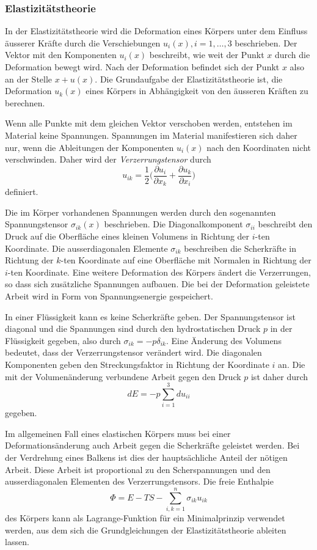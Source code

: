%
%
\subsubsection{Elastizitätstheorie}
In der Elastizitätstheorie wird die Deformation eines Körpers unter
dem Einfluss äusserer Kräfte durch die Verschiebungen
$u_{i}(x), i=1,\dots,3$ beschrieben.
Der Vektor mit den Komponenten $u_i(x)$ beschreibt, wie weit der Punkt
$x$ durch die Deformation bewegt wird.
Nach der Deformation befindet sich der Punkt $x$ also an der Stelle $x+u(x)$.
Die Grundaufgabe der Elastizitätstheorie ist, die Deformation $u_k(x)$
eines Körpers in Abhängigkeit von den äusseren Kräften zu berechnen.

Wenn alle Punkte mit dem gleichen Vektor verschoben werden, entstehen
im Material keine Spannungen.
Spannungen im Material manifestieren sich daher nur, wenn die Ableitungen
der Komponenten $u_i(x)$ nach den Koordinaten nicht verschwinden.
Daher wird der {\em Verzerrungstensor}
%
durch
\begin{equation}
u_{ik}
=
\frac12\biggl(
\frac{\partial u_i}{\partial x_k}
+
\frac{\partial u_k}{\partial x_i}
\biggr)
\label{buch:felder:ostrogradski:eqn:verzerrungstensor}
\end{equation}
definiert.

Die im Körper vorhandenen Spannungen werden durch den sogenannten
Spannungstensor $\sigma_{ik}(x)$ beschrieben.
Die Diagonalkomponent $\sigma_{ii}$ beschreibt den Druck auf die 
Oberfläche eines kleinen Volumens in Richtung der $i$-ten Koordinate.
Die ausserdiagonalen Elemente $\sigma_{ik}$ beschreiben die
Scherkräfte in Richtung der $k$-ten Koordinate auf eine Oberfläche
mit Normalen in Richtung der $i$-ten Koordinate.
Eine weitere Deformation des Körpers ändert die Verzerrungen, so dass
sich zusätzliche Spannungen aufbauen.
Die bei der Deformation geleistete Arbeit wird in Form von Spannungsenergie
gespeichert.

In einer Flüssigkeit kann es keine Scherkräfte geben.
Der Spannungstensor ist diagonal und die Spannungen sind durch
den hydrostatischen Druck $p$ in der Flüssigkeit gegeben, also
durch $\sigma_{ik}=-p\delta_{ik}$.
Eine Änderung des Volumens bedeutet, dass der Verzerrungstensor
verändert wird.
Die diagonalen Komponenten geben den Streckungsfaktor in Richtung der
Koordinate $i$ an.
Die mit der Volumenänderung verbundene Arbeit gegen den Druck $p$ ist
daher durch
\[
dE
=
-p\sum_{i=1}^3 du_{ii}
\]
gegeben.

Im allgemeinen Fall eines elastischen Körpers muss bei einer
Deformationsänderung auch Arbeit gegen die Scherkräfte geleistet
werden.
Bei der Verdrehung eines Balkens ist dies der hauptsächliche Anteil
der nötigen Arbeit.
Diese Arbeit ist proportional zu den Scherspannungen und den ausserdiagonalen
Elementen des Verzerrungstensors.
Die freie Enthalpie
\[
\Phi
=
E - TS - \sum_{i,k=1}^n \sigma_{ik} u_{ik}
\]
des Körpers kann als Lagrange-Funktion für ein Minimalprinzip
verwendet werden, aus dem sich die Grundgleichungen der
Elastizitätstheorie ableiten lassen.

